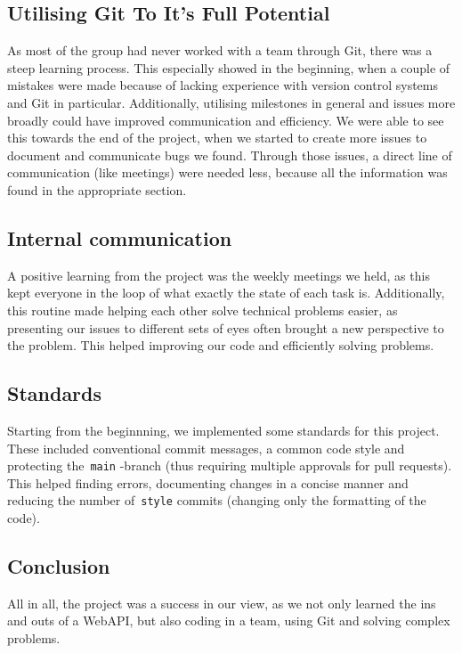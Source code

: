 \documentclass[a4paper, 11pt]{article}
\begin{document}
    \subsection{Utilising Git To It's Full Potential}
    As most of the group had never worked with a team through Git, there was a steep learning process. This especially showed in the beginning, when a couple of mistakes were made because of lacking experience with version control systems and Git in particular. Additionally, utilising milestones in general and issues more broadly could have improved communication and efficiency. We were able to see this towards the end of the project, when we started to create more issues to document and communicate bugs we found. Through those issues, a direct line of communication (like meetings) were needed less, because all the information was found in the appropriate section.

    \subsection{Internal communication}
    A positive learning from the project was the weekly meetings we held, as this kept everyone in the loop of what exactly the state of each task is. Additionally, this routine made helping each other solve technical problems easier, as presenting our issues to different sets of eyes often brought a new perspective to the problem. This helped improving our code and efficiently solving problems.\\

    \subsection{Standards}
    Starting from the beginnning, we implemented some standards for this project. These included conventional commit messages, a common code style and protecting the~\lstinline|main| -branch (thus requiring multiple approvals for pull requests). This helped finding errors, documenting changes in a concise manner and reducing the number of~\lstinline|style| commits (changing only the formatting of the code).

    \subsection{Conclusion}
    All in all, the project was a success in our view, as we not only learned the ins and outs of a WebAPI, but also coding in a team, using Git and solving complex problems.
\end{document}
